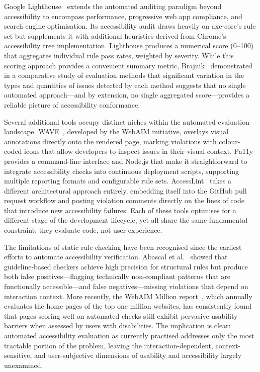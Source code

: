 Google Lighthouse~\cite{lighthouse} extends the automated auditing paradigm beyond accessibility to encompass performance, progressive web app compliance, and search engine optimisation. Its accessibility audit draws heavily on axe-core's rule set but supplements it with additional heuristics derived from Chrome's accessibility tree implementation. Lighthouse produces a numerical score (0--100) that aggregates individual rule pass rates, weighted by severity. While this scoring approach provides a convenient summary metric, Brajnik~\cite{brajnik2008comparative} demonstrated in a comparative study of evaluation methods that significant variation in the types and quantities of issues detected by each method suggests that no single automated approach---and by extension, no single aggregated score---provides a reliable picture of accessibility conformance.

Several additional tools occupy distinct niches within the automated evaluation landscape. WAVE~\cite{wave}, developed by the WebAIM initiative, overlays visual annotations directly onto the rendered page, marking violations with colour-coded icons that allow developers to inspect issues in their visual context. Pa11y~\cite{pa11y} provides a command-line interface and Node.js  that make it straightforward to integrate accessibility checks into continuous deployment scripts, supporting multiple reporting formats and configurable rule sets. AccessLint~\cite{accesslint} takes a different architectural approach entirely, embedding itself into the GitHub pull request workflow and posting violation comments directly on the lines of code that introduce new accessibility failures. Each of these tools optimises for a different stage of the development lifecycle, yet all share the same fundamental constraint: they evaluate code, not user experience.

The limitations of static rule checking have been recognised since the earliest efforts to automate accessibility verification. Abascal et al.~\cite{abascal2004guidelines} showed that guideline-based checkers achieve high precision for structural rules but produce both false positives---flagging technically non-compliant patterns that are functionally accessible---and false negatives---missing violations that depend on interaction context. More recently, the WebAIM Million report~\cite{webaim_million}, which annually evaluates the home pages of the top one million websites, has consistently found that pages scoring well on automated checks still exhibit pervasive usability barriers when assessed by users with disabilities. The implication is clear: automated accessibility evaluation as currently practised addresses only the most tractable portion of the problem, leaving the interaction-dependent, context-sensitive, and user-subjective dimensions of usability and accessibility largely unexamined.


